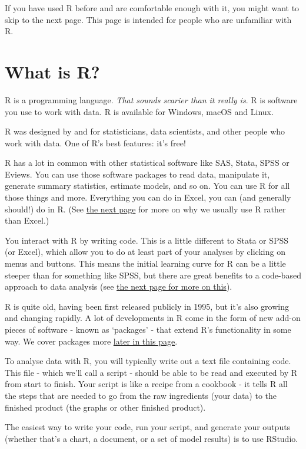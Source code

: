 \documentclass[]{book}
\begin{document}
If you have used R before and are comfortable enough with it, you might want to skip to the next page. This page is intended for people who are unfamiliar with R.

\hypertarget{what-is-r}{%
\section{What is R?}\label{what-is-r}}

R is a programming language. \emph{That sounds scarier than it really is}. R is software you use to work with data. R is available for Windows, macOS and Linux.

R was designed by and for statisticians, data scientists, and other people who work with data. One of R's best features: it's free!

R has a lot in common with other statistical software like SAS, Stata, SPSS or Eviews. You can use those software packages to read data, manipulate it, generate summary statistics, estimate models, and so on. You can use R for all those things and more. Everything you can do in Excel, you can (and generally should!) do in R. (See \protect\hyperlink{why-script}{the next page} for more on why we usually use R rather than Excel.)

You interact with R by writing code. This is a little different to Stata or SPSS (or Excel), which allow you to do at least part of your analyses by clicking on menus and buttons. This means the initial learning curve for R can be a little steeper than for something like SPSS, but there are great benefits to a code-based approach to data analysis (see \protect\hyperlink{why-script}{the next page for more on this}).

R is quite old, having been first released publicly in 1995, but it's also growing and changing rapidly. A lot of developments in R come in the form of new add-on pieces of software - known as `packages' - that extend R's functionality in some way. We cover packages more \protect\hyperlink{packages}{later in this page}.

To analyse data with R, you will typically write out a text file containing code. This file - which we'll call a script - should be able to be read and executed by R from start to finish. Your script is like a recipe from a cookbook - it tells R all the steps that are needed to go from the raw ingredients (your data) to the finished product (the graphs or other finished product).

The easiest way to write your code, run your script, and generate your outputs (whether that's a chart, a document, or a set of model results) is to use RStudio.
\end{document}
